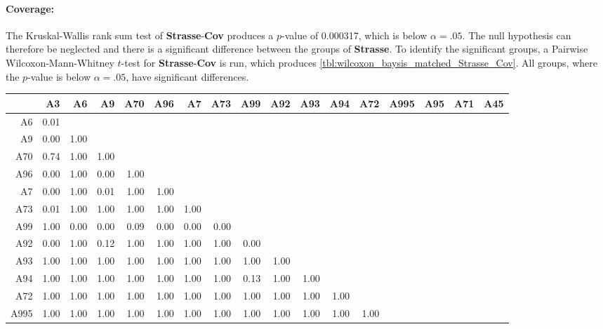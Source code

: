 \paragraph{Coverage:}
The Kruskal-Wallis rank sum test of \textbf{Strasse}-\textbf{Cov} produces a $p$-value of 0.000317, which is below $\alpha=.05$. The null hypothesis can therefore be neglected and there is a significant difference between the groups of \textbf{Strasse}. To identify the significant groups, a Pairwise Wilcoxon-Mann-Whitney $t$-test for \textbf{Strasse}-\textbf{Cov} is run, which produces \autoref{tbl:wilcoxon_baysis_matched_Strasse_Cov}. All groups, where the $p$-value is below $\alpha=.05$, have significant differences. 
\begin{table}[ht]
	\tiny
	\setlength{\tabcolsep}{4pt}
	\centering
	\begin{tabular}{rrrrrrrrrrrrrrrrr}
	  	\toprule
				& A3   & A6   & A9   & A70  & A96  & A7   & A73 & A99 & A92 & A93 & A94 & A72 & A995 & A95 & A71 & A45 \\ 
	  	\midrule
		A6 		& 0.01 &  &  &  &  &  &  &  &  &  &  &  &  &  &  &  \\ 
	  	A9 		& 0.00 & 1.00 &  &  &  &  &  &  &  &  &  &  &  &  &  &  \\ 
	  	A70 	& 0.74 & 1.00 & 1.00 &  &  &  &  &  &  &  &  &  &  &  &  &  \\ 
	  	A96 	& 0.00 & 1.00 & 0.00 & 1.00 &  &  &  &  &  &  &  &  &  &  &  &  \\ 
	  	A7 		& 0.00 & 1.00 & 0.01 & 1.00 & 1.00 &  &  &  &  &  &  &  &  &  &  &  \\ 
	  	A73 	& 0.01 & 1.00 & 1.00 & 1.00 & 1.00 & 1.00 &  &  &  &  &  &  &  &  &  &  \\ 
	  	A99 	& 1.00 & 0.00 & 0.00 & 0.09 & 0.00 & 0.00 & 0.00 &  &  &  &  &  &  &  &  &  \\ 
	  	A92 	& 0.00 & 1.00 & 0.12 & 1.00 & 1.00 & 1.00 & 1.00 & 0.00 &  &  &  &  &  &  &  &  \\ 
	  	A93 	& 1.00 & 1.00 & 1.00 & 1.00 & 1.00 & 1.00 & 1.00 & 1.00 & 1.00 &  &  &  &  &  &  &  \\ 
	  	A94 	& 1.00 & 1.00 & 1.00 & 1.00 & 1.00 & 1.00 & 1.00 & 0.13 & 1.00 & 1.00 &  &  &  &  &  &  \\ 
	  	A72 	& 1.00 & 1.00 & 1.00 & 1.00 & 1.00 & 1.00 & 1.00 & 1.00 & 1.00 & 1.00 & 1.00 &  &  &  &  &  \\ 
	  	A995 	& 1.00 & 1.00 & 1.00 & 1.00 & 1.00 & 1.00 & 1.00 & 1.00 & 1.00 & 1.00 & 1.00 & 1.00 &  &  &  &  \\ 

\end{tabular}
\end{table}
